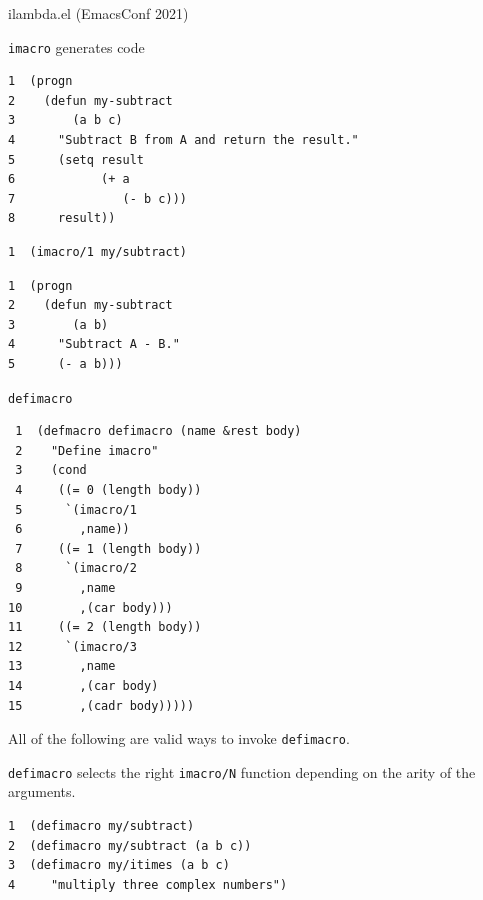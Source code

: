 \documentclass[presentation]{beamer}
\begin{document}
\begin{frame}[label={sec:orgbf8b945},fragile]{ilambda.el (EmacsConf 2021)}
\begin{block}{\texttt{imacro} generates code}
\begin{verbatim}
1  (progn
2    (defun my-subtract
3        (a b c)
4      "Subtract B from A and return the result."
5      (setq result
6            (+ a
7               (- b c)))
8      result))
\end{verbatim}

\begin{verbatim}
1  (imacro/1 my/subtract)
\end{verbatim}

\begin{verbatim}
1  (progn
2    (defun my-subtract
3        (a b)
4      "Subtract A - B."
5      (- a b)))
\end{verbatim}

\texttt{defimacro}

\begin{verbatim}
 1  (defmacro defimacro (name &rest body)
 2    "Define imacro"
 3    (cond
 4     ((= 0 (length body))
 5      `(imacro/1
 6        ,name))
 7     ((= 1 (length body))
 8      `(imacro/2
 9        ,name
10        ,(car body)))
11     ((= 2 (length body))
12      `(imacro/3
13        ,name
14        ,(car body)
15        ,(cadr body)))))
\end{verbatim}

All of the following are valid ways to invoke \texttt{defimacro}.

\texttt{defimacro} selects the right \texttt{imacro/N} function depending on the arity of the arguments.

\begin{verbatim}
1  (defimacro my/subtract)
2  (defimacro my/subtract (a b c))
3  (defimacro my/itimes (a b c)
4     "multiply three complex numbers")
\end{verbatim}
\end{block}
\end{frame}
\end{document}
